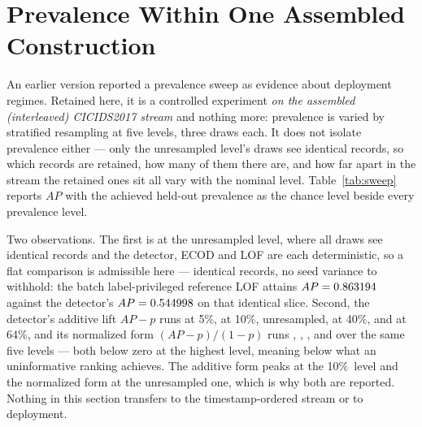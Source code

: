 \documentclass[manuscript,screen,nonacm]{acmart}
\begin{document}
\section{Prevalence Within One Assembled Construction}
\label{sec:sweep}

An earlier version reported a prevalence sweep as evidence about deployment
regimes. Retained here, it is a controlled experiment \emph{on the assembled
(interleaved) CICIDS2017 stream} and nothing more: prevalence is varied by
stratified resampling at five levels, three draws each. It does not isolate
prevalence either --- only the unresampled level's draws see identical records,
so which records are retained, how many of them there are, and how far apart in
the stream the retained ones sit all vary with the nominal level. Table~\ref{tab:sweep} reports $AP$ with the achieved held-out prevalence
as the chance level beside every prevalence level.

\begin{table}
\caption{AUC-PR by prevalence level on the assembled construction (mean over
three resampling draws). ``Chance level'' is the achieved held-out prevalence.
At the unresampled level all draws see the same records; at resampled levels
the three draws of every method differ by the resampling draw. Per-draw values
and normalized lift are in the archived findings.}
\label{tab:sweep}

\end{table}

Two observations. The first is at the unresampled level, where all draws see
identical records and the detector, ECOD and LOF are each deterministic, so a
flat comparison is admissible here --- identical records, no seed variance to
withhold: the batch label-privileged reference LOF
attains $AP=0.863194$ against the detector's
$AP=0.544998$ on that identical slice.
Second, the detector's additive lift $AP-p$ runs \STwoLFiveProposedLift{} at
5\%, \STwoLTenProposedLift{} at 10\%, \STwoLUnresampledProposedLift{}
unresampled, \STwoLFortyProposedLift{} at 40\%, and
\STwoLSixtyFourProposedLift{} at 64\%, and its normalized form
$(AP-p)/(1-p)$ runs \STwoLFiveProposedNormLift, \STwoLTenProposedNormLift,
\STwoLUnresampledProposedNormLift, \STwoLFortyProposedNormLift{} and
\STwoLSixtyFourProposedNormLift{} over the same five levels --- both below zero
at the highest level, meaning below what an uninformative ranking achieves. The
additive form peaks at the 10\%\ level and the normalized form at the
unresampled one, which is why both are reported. Nothing in this section transfers to the timestamp-ordered stream or
to deployment.
\end{document}
